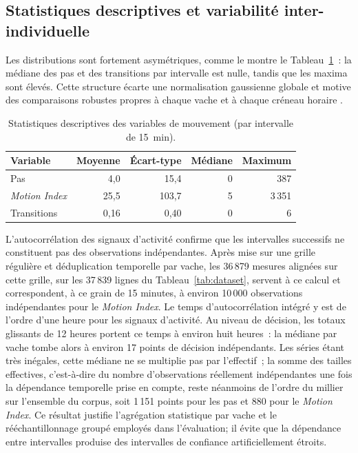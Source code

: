 \subsection{Statistiques descriptives et variabilité inter-individuelle}
\label{subsec:statistiques_corpus}
Les distributions sont fortement asymétriques, comme le montre le
Tableau~\ref{tab:statistiques_brutes}~: la médiane des pas et des transitions par intervalle est nulle, tandis que les maxima sont
élevés. Cette structure écarte une normalisation gaussienne globale et motive des
comparaisons robustes propres à chaque vache et à chaque créneau horaire
\citep{leys2013detecting}.

\begin{table}[H]
  \centering
  \caption{Statistiques descriptives des variables de mouvement (par intervalle de 15~min).}
  \label{tab:statistiques_brutes}
  \small
  \begin{tabular}{lrrrr}
    \toprule
    Variable & Moyenne & Écart-type & Médiane & Maximum \\
    \midrule
    Pas & 4,0 & 15,4 & 0 & 387 \\
    \textit{Motion Index} & 25,5 & 103,7 & 5 & 3\,351 \\
    Transitions & 0,16 & 0,40 & 0 & 6 \\
    \bottomrule
  \end{tabular}
\end{table}

L'autocorrélation des signaux d'activité confirme que les intervalles successifs ne
constituent pas des observations
indépendantes. Après mise sur une grille régulière et déduplication temporelle par vache, les
36\,879 mesures alignées sur cette grille, sur les 37\,839 lignes du
Tableau~\ref{tab:dataset}, servent à ce calcul et correspondent, à ce grain de 15 minutes, à
environ 10\,000 observations indépendantes pour le \textit{Motion Index}. Le temps
d'autocorrélation intégré y est de l'ordre d'une heure pour les signaux d'activité. Au niveau de décision, les totaux
glissants de 12 heures portent ce temps à environ huit heures~: la médiane par vache tombe
alors à environ 17 points de décision indépendants. Les séries étant très inégales, cette
médiane ne se multiplie pas par l'effectif~; la somme des tailles effectives, c'est-à-dire du
nombre d'observations réellement indépendantes une fois la dépendance temporelle prise en
compte, reste néanmoins de l'ordre du millier sur l'ensemble du corpus, soit 1\,151 points pour les pas et 880 pour le
\textit{Motion Index}. Ce résultat justifie l'agrégation statistique par vache et le
rééchantillonnage groupé employés dans l'évaluation; il évite que la dépendance entre
intervalles produise des intervalles de confiance artificiellement étroits.

